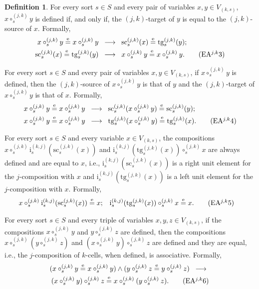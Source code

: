 \documentclass[a4paper, reqno
]{amsart}
\newcommand{\eeq}{\overset{\mathrm e}{=}}      %
\newcommand{\src}{\mathrm{sc}}
\newcommand{\tgt}{\mathrm{tg}}
\theoremstyle{plain}
\theoremstyle{definition}
\newtheorem{definition}[theorem]{Definition}
\begin{document}
\begin{definition}
For every sort $s\in S$ and every pair of variables $x,y\in V_{(k,s)}$, $x\circ^{(j,k)}_{s} y$ is defined if, and only if, the $(j,k)$-target of $y$ is equal to the $(j,k)$-source of $x$.
Formally,
\begin{align*}
x\circ^{(j,k)}_{s} y\eeq x\circ^{(j,k)}_{s} y \;\;
&\longrightarrow \;\;
\src^{(j,k)}_{s}(x)\eeq\tgt^{(j,k)}_{s}(y);\\
\src^{(j,k)}_{s}(x)\eeq\tgt^{(j,k)}_{s}(y) \;\;
&\longrightarrow \;\;
x\circ^{(j,k)}_{s} y\eeq x\circ^{(j,k)}_{s}y.\label{AGlobularAjk3}\tag{EA$^{j,k}$3}
\end{align*}

For every sort $s\in S$ and every pair of variables $x,y\in V_{(k,s)}$, if $x\circ^{(j,k)}_{s} y$ is defined, then the $(j,k)$-source of $x\circ^{(j,k)}_{s}y$ is that of $y$ and the $(j,k)$-target of $x\circ^{(j,k)}_{s}y$ is that of $x$.
Formally,
\begin{align*}
x\circ^{(j,k)}_{s}y\eeq x\circ^{(j,k)}_{s}y \;\;
&\longrightarrow \;\;
\src^{(j,k)}_{s}(x\circ^{(j,k)}_{s}y)\eeq\src^{(j,k)}_{s}(y);\\
x\circ^{(j,k)}_{s}y\eeq x\circ^{(j,k)}_{s}y \;\;
&\longrightarrow \;\;
\tgt^{(j,k)}_{s}(x\circ^{(j,k)}_{s}y)\eeq\tgt^{(j,k)}_{s}(x).\label{AGlobularAjk4}\tag{EA$^{j,k}$4}
\end{align*}

For every sort $s\in S$ and every variable $x\in V_{(k,s)}$, the compositions $x\circ^{(j,k)}_{s}\mathrm{i}^{(k,j)}_{s}(\src^{(j,k)}_{s}(x))$ and $\mathrm{i}^{(k,j)}_{s}(\tgt^{(j,k)}_{s}(x))\circ^{(j,k)}_{s}x$ are always defined and are equal to $x$, i.e., $\mathrm{i}^{(k,j)}_{s}(\src^{(j,k)}_{s}(x))$ is a right unit element for the $j$-composition with $x$ and $\mathrm{i}^{(k,j)}_{s}(\tgt^{(j,k)}_{s}(x))$ is a left unit element for the $j$-composition with $x$.
Formally,
\begin{align*}
x\circ^{(j,k)}_{s}\mathrm{i}^{(k,j)}_{s}(\src^{(j,k)}_{s}(x))&\eeq x;
&
\mathrm{i}^{(k,j)}_{s}(\tgt^{(j,k)}_{s}(x))\circ^{(j,k)}_{s}x&\eeq x.\label{AGlobularAjk5}\tag{EA$^{j,k}$5}
\end{align*}

For every sort $s\in S$ and every triple of variables $x, y, z\in V_{(k,s)}$, if the compositions $x\circ^{(j,k)}_{s}y$ and $y\circ^{(j,k)}_{s}z$ are defined, then the compositions $x\circ^{(j,k)}_{s}(y\circ^{(j,k)}_{s}z)$ and $(x\circ^{(j,k)}_{s}y)\circ^{(j,k)}_{s}z$ are defined and they are equal, i.e., the $j$-composition of $k$-cells, when defined, is associative.
Formally,
\begin{multline*}
(x\circ^{(j,k)}_{s}y\eeq x\circ^{(j,k)}_{s}y)
\wedge
(y\circ^{(j,k)}_{s}z\eeq y\circ^{(j,k)}_{s}z)\;\;
\longrightarrow \;\;\\
(x\circ^{(j,k)}_{s}y)\circ^{(j,k)}_{s}z\eeq x\circ^{(j,k)}_{s}(y\circ^{(j,k)}_{s}z).\label{AGlobularAjk6}\tag{EA$^{j,k}$6}
\end{multline*}


\end{definition}
\end{document}
